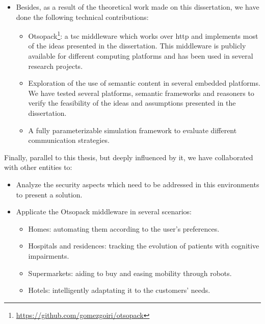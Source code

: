 \begin{itemize}
  \item Besides, as a result of the theoretical work made on this dissertation, we have done the following technical contributions:
    \begin{itemize}
      \item Otsopack\footnote{\url{https://github.com/gomezgoiri/otsopack}}: a \ac{tsc} middleware which works over \ac{http} and implements most of the ideas presented in the dissertation.
            This middleware is publicly available for different computing platforms and has been used in several research projects.
      \item Exploration of the use of semantic content in several embedded platforms.
	    We have tested several platforms, semantic frameworks and reasoners to verify the feasibility of the ideas and assumptions presented in the dissertation.
      \item A fully parameterizable simulation framework to evaluate different communication strategies. %
    \end{itemize}
\end{itemize}


Finally, parallel to this thesis, but deeply influenced by it, we have collaborated with other entities to:
\begin{itemize}
  \item Analyze the security aspects which need to be addressed in this environments to present a solution. %
  \item Applicate the Otsopack middleware in several scenarios:
    \begin{itemize}
      \item Homes: automating them according to the user's preferences. %
      \item Hospitals and residences: tracking the evolution of patients with cognitive impairments.  %
      \item Supermarkets: aiding to buy and easing mobility through robots.
      \item Hotels: intelligently adaptating it to the customers' needs.
    \end{itemize}
\end{itemize}